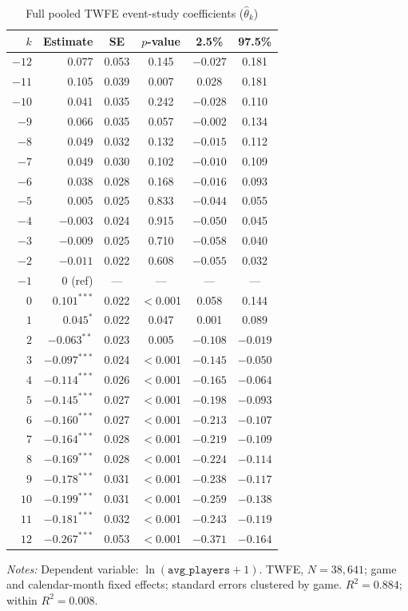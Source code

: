 \documentclass[11pt]{article}
\begin{document}
\begin{table}[H]
\centering\small
\caption{Full pooled TWFE event-study coefficients ($\hat{\theta}_k$)}
\label{tab:fullcoefs}
\begin{tabular}{rrcccc}
\toprule
$k$ & Estimate & SE & $p$-value & 2.5\% & 97.5\% \\
\midrule
$-12$ &  0.077 & 0.053 & 0.145 & $-0.027$ & 0.181 \\
$-11$ &  0.105 & 0.039 & 0.007 &    0.028 & 0.181 \\
$-10$ &  0.041 & 0.035 & 0.242 & $-0.028$ & 0.110 \\
$-9$  &  0.066 & 0.035 & 0.057 & $-0.002$ & 0.134 \\
$-8$  &  0.049 & 0.032 & 0.132 & $-0.015$ & 0.112 \\
$-7$  &  0.049 & 0.030 & 0.102 & $-0.010$ & 0.109 \\
$-6$  &  0.038 & 0.028 & 0.168 & $-0.016$ & 0.093 \\
$-5$  &  0.005 & 0.025 & 0.833 & $-0.044$ & 0.055 \\
$-4$  & $-0.003$ & 0.024 & 0.915 & $-0.050$ & 0.045 \\
$-3$  & $-0.009$ & 0.025 & 0.710 & $-0.058$ & 0.040 \\
$-2$  & $-0.011$ & 0.022 & 0.608 & $-0.055$ & 0.032 \\
$-1$  & 0 (ref) & --- & --- & --- & --- \\
\midrule
$0$  & $\mathbf{0.101}^{***}$ & 0.022 & $<$0.001 & 0.058 & 0.144 \\
$1$  & $0.045^{*}$ & 0.022 & 0.047 &  0.001 & 0.089 \\
$2$  & $-0.063^{**}$ & 0.023 & 0.005 & $-0.108$ & $-0.019$ \\
$3$  & $-0.097^{***}$ & 0.024 & $<$0.001 & $-0.145$ & $-0.050$ \\
$4$  & $-0.114^{***}$ & 0.026 & $<$0.001 & $-0.165$ & $-0.064$ \\
$5$  & $-0.145^{***}$ & 0.027 & $<$0.001 & $-0.198$ & $-0.093$ \\
$6$  & $-0.160^{***}$ & 0.027 & $<$0.001 & $-0.213$ & $-0.107$ \\
$7$  & $-0.164^{***}$ & 0.028 & $<$0.001 & $-0.219$ & $-0.109$ \\
$8$  & $-0.169^{***}$ & 0.028 & $<$0.001 & $-0.224$ & $-0.114$ \\
$9$  & $-0.178^{***}$ & 0.031 & $<$0.001 & $-0.238$ & $-0.117$ \\
$10$ & $-0.199^{***}$ & 0.031 & $<$0.001 & $-0.259$ & $-0.138$ \\
$11$ & $-0.181^{***}$ & 0.032 & $<$0.001 & $-0.243$ & $-0.119$ \\
$12$ & $-0.267^{***}$ & 0.053 & $<$0.001 & $-0.371$ & $-0.164$ \\
\bottomrule
\end{tabular}
\medskip

\noindent\small\textit{Notes:} Dependent variable: $\ln(\texttt{avg\_players}+1)$.
  TWFE, $N = 38{,}641$; game and calendar-month fixed effects;
  standard errors clustered by game.
  $R^2 = 0.884$; within $R^2 = 0.008$.
\end{table}
\end{document}
